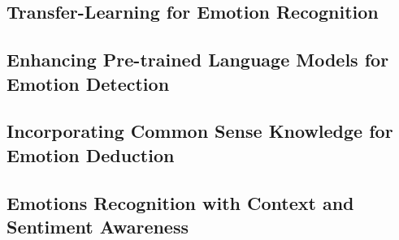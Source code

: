 \subsection{Transfer-Learning for Emotion Recognition}

\subsection{Enhancing Pre-trained Language Models for Emotion Detection}

\subsection{Incorporating Common Sense Knowledge for Emotion Deduction}

\subsection{Emotions Recognition with Context and Sentiment Awareness}

